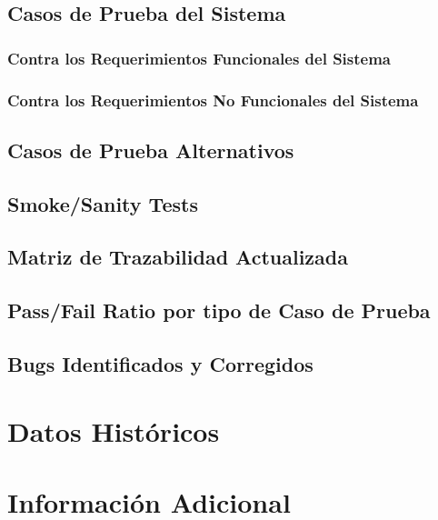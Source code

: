 \documentclass[10pt]{article} %
\begin{document}
\subsection{Casos de Prueba del Sistema}
\subsubsection{Contra los Requerimientos Funcionales del Sistema}
\subsubsection{Contra los Requerimientos No Funcionales del Sistema}
\subsection{Casos de Prueba Alternativos}

\subsection{Smoke/Sanity Tests}

\subsection{Matriz de Trazabilidad Actualizada}

\subsection{Pass/Fail Ratio por tipo de Caso de Prueba}

\subsection{Bugs Identificados y Corregidos}


\section{Datos Históricos}


\section{Información Adicional}
\end{document}
